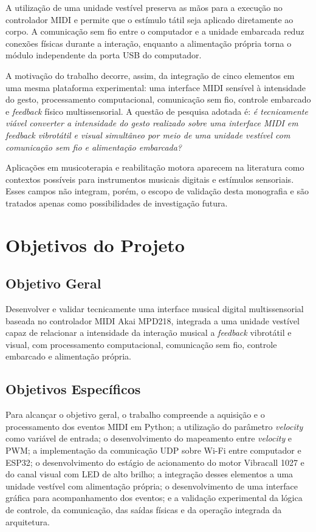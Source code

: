A utilização de uma unidade vestível preserva as mãos para a execução no controlador MIDI e permite que o estímulo tátil seja aplicado diretamente ao corpo. A comunicação sem fio entre o computador e a unidade embarcada reduz conexões físicas durante a interação, enquanto a alimentação própria torna o módulo independente da porta USB do computador.

A motivação do trabalho decorre, assim, da integração de cinco elementos em uma mesma plataforma experimental: uma interface MIDI sensível à intensidade do gesto, processamento computacional, comunicação sem fio, controle embarcado e \textit{feedback} físico multissensorial. A questão de pesquisa adotada é: \textit{é tecnicamente viável converter a intensidade do gesto realizado sobre uma interface MIDI em \textit{feedback} vibrotátil e visual simultâneo por meio de uma unidade vestível com comunicação sem fio e alimentação embarcada?}

Aplicações em musicoterapia e reabilitação motora aparecem na literatura como contextos possíveis para instrumentos musicais digitais e estímulos sensoriais. Esses campos não integram, porém, o escopo de validação desta monografia e são tratados apenas como possibilidades de investigação futura.

\section{Objetivos do Projeto}

\subsection{Objetivo Geral}

Desenvolver e validar tecnicamente uma interface musical digital multissensorial baseada no controlador MIDI Akai MPD218, integrada a uma unidade vestível capaz de relacionar a intensidade da interação musical a \textit{feedback} vibrotátil e visual, com processamento computacional, comunicação sem fio, controle embarcado e alimentação própria.

\subsection{Objetivos Específicos}

Para alcançar o objetivo geral, o trabalho compreende a aquisição e o processamento dos eventos MIDI em Python; a utilização do parâmetro \textit{velocity} como variável de entrada; o desenvolvimento do mapeamento entre \textit{velocity} e PWM; a implementação da comunicação UDP sobre Wi-Fi entre computador e ESP32; o desenvolvimento do estágio de acionamento do motor Vibracall 1027 e do canal visual com LED de alto brilho; a integração desses elementos a uma unidade vestível com alimentação própria; o desenvolvimento de uma interface gráfica para acompanhamento dos eventos; e a validação experimental da lógica de controle, da comunicação, das saídas físicas e da operação integrada da arquitetura.

